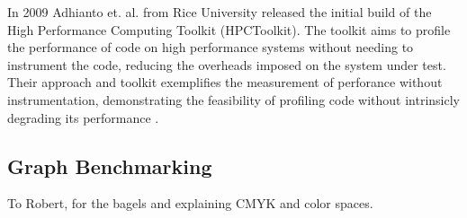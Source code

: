 \documentclass[sigconf,authordraft]{acmart}
\begin{document}
\par{In 2009 Adhianto et. al. from Rice University released the initial build of the High Performance Computing Toolkit (HPCToolkit). 
The toolkit aims to profile the performance of code on high performance systems without needing to instrument the code, reducing the overheads imposed on the system under test. 
Their approach and toolkit exemplifies the measurement of perforance without instrumentation, demonstrating the feasibility of profiling code without intrinsicly degrading its performance \cite{Adhianto2010}.}

\subsection{Graph Benchmarking}


\begin{acks}
To Robert, for the bagels and explaining CMYK and color spaces.
\end{acks}




\end{document}
